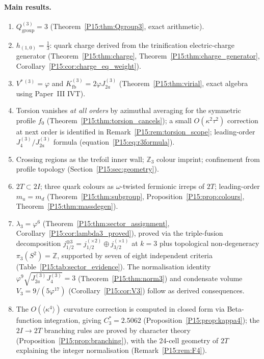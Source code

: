 \documentclass[11pt,a4paper]{article}
\theoremstyle{definition}\newtheorem{definition}[theorem]{Definition}
\theoremstyle{remark}
\newcommand{\vp}{\varphi}
\newcommand{\lam}{\lambda}
\newcommand{\Ja}{J_{2a}}
\newcommand{\Jfour}{J_4}
\newcommand{\Kfb}{K_{\mathrm{fb}}}
\newcommand{\twoI}{2I}
\newcommand{\twoT}{2T}
\begin{document}
\paragraph{Main results.}
\begin{enumerate}[noitemsep,label=(\arabic*)]
\item $Q_{\mathrm{group}}^{(3)}=3$
  (Theorem~\ref{P15:thm:Qgroup3}, exact arithmetic).
\item $h_{(1,0)}=\tfrac{1}{3}$: quark charge derived from the
  trinification electric-charge generator
  (Theorem~\ref{P15:thm:charge}, Theorem~\ref{P15:thm:charge_generator},
  Corollary~\ref{P15:cor:charge_eq_weight}).
\item $V^{*\,(3)}=\vp$ and $\Kfb^{(3)}=2\vp\Ja^{(3)}$
  (Theorem~\ref{P15:thm:virial}, exact algebra using Paper~III IVT).
\item Torsion vanishes \emph{at all orders} by azimuthal averaging
  for the symmetric profile $f_0$ (Theorem~\ref{P15:thm:torsion_cancels});
  a small $O(\kappa^2\tau^2)$ correction at next order is
  identified in Remark~\ref{P15:rem:torsion_scope};
  leading-order $J_4^{(3)}/J_{2a}^{(3)}$ formula
  (equation~\eqref{P15:eq:r3formula}).
\item Crossing regions as the trefoil inner wall; $\mathbb{Z}_3$
  colour imprint; confinement from profile topology
  (Section~\ref{P15:sec:geometry}).
\item $\twoT\subset\twoI$; three quark colours as $\omega$-twisted
  fermionic irreps of $\twoT$; leading-order $m_u=m_d$
  (Theorem~\ref{P15:thm:subgroup}, Proposition~\ref{P15:prop:colours},
  Theorem~\ref{P15:thm:massdegen}).
\item $\lam_3=\vp^6$ (Theorem~\ref{P15:thm:sector_assignment},
  Corollary~\ref{P15:cor:lambda3_proved}),
  proved via the triple-fusion decomposition
  $j_{1/2}^{\otimes 3}=j_{1/2}^{(\times 2)}\oplus j_{3/2}^{(\times 1)}$
  at $k=3$ plus topological non-degeneracy $\pi_3(S^2)=\mathbb{Z}$,
  supported by seven of eight independent criteria
  (Table~\ref{P15:tab:sector_evidence}).
  The normalisation identity $\vp^9\sqrt{\Ja^{(3)}\Jfour^{(3)}}=3$
  (Theorem~\ref{P15:thm:norm3}) and condensate volume $V_3=9/(5\vp^{17})$
  (Corollary~\ref{P15:cor:V3}) follow as derived consequences.
\item The $O(\langle\kappa^4\rangle)$ curvature correction is computed
  in closed form via Beta-function integration, giving
  $C_3^*=2.5062$ (Proposition~\ref{P15:prop:kappa4}); the
  $2I\to 2T$ branching rules are proved by character theory
  (Proposition~\ref{P15:prop:branching}), with the 24-cell geometry
  of $\twoT$ explaining the integer normalisation
  (Remark~\ref{P15:rem:F4}).
\end{enumerate}
\end{document}
